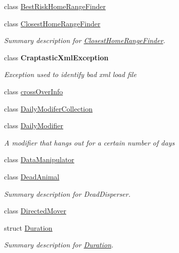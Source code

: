 \begin{DoxyCompactItemize}
class \hyperlink{class_s_e_a_r_c_h_1_1_best_risk_home_range_finder}{Best\-Risk\-Home\-Range\-Finder}
\begin{DoxyCompactList}\small\item\em \end{DoxyCompactList}\item 
class \hyperlink{class_s_e_a_r_c_h_1_1_closest_home_range_finder}{Closest\-Home\-Range\-Finder}
\begin{DoxyCompactList}\small\item\em Summary description for \hyperlink{class_s_e_a_r_c_h_1_1_closest_home_range_finder}{Closest\-Home\-Range\-Finder}. \end{DoxyCompactList}\item 
class {\bfseries Craptastic\-Xml\-Exception}
\begin{DoxyCompactList}\small\item\em Exception used to identify bad xml load file \end{DoxyCompactList}\item 
class \hyperlink{class_s_e_a_r_c_h_1_1cross_over_info}{cross\-Over\-Info}
\item 
class \hyperlink{class_s_e_a_r_c_h_1_1_daily_modifer_collection}{Daily\-Modifer\-Collection}
\item 
class \hyperlink{class_s_e_a_r_c_h_1_1_daily_modifier}{Daily\-Modifier}
\begin{DoxyCompactList}\small\item\em A modifier that hangs out for a certain number of days \end{DoxyCompactList}\item 
class \hyperlink{class_s_e_a_r_c_h_1_1_data_manipulator}{Data\-Manipulator}
\item 
class \hyperlink{class_s_e_a_r_c_h_1_1_dead_animal}{Dead\-Animal}
\begin{DoxyCompactList}\small\item\em Summary description for Dead\-Disperser. \end{DoxyCompactList}\item 
class \hyperlink{class_s_e_a_r_c_h_1_1_directed_mover}{Directed\-Mover}
\begin{DoxyCompactList}\small\item\em \end{DoxyCompactList}\item 
struct \hyperlink{struct_s_e_a_r_c_h_1_1_duration}{Duration}
\begin{DoxyCompactList}\small\item\em Summary description for \hyperlink{struct_s_e_a_r_c_h_1_1_duration}{Duration}. \end{DoxyCompactList}\item 

\end{DoxyCompactItemize}
